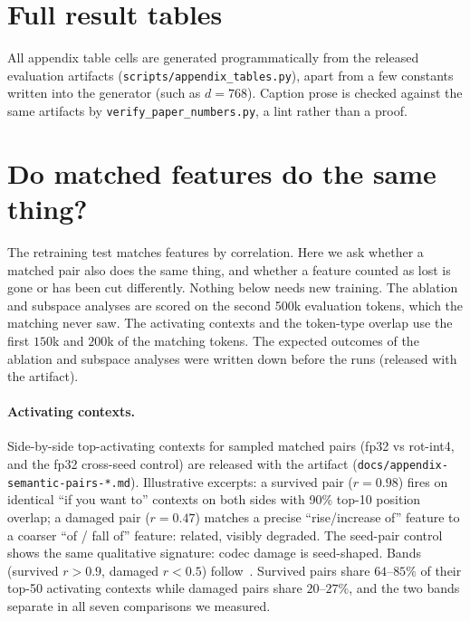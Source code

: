 \documentclass{article}
\begin{document}
\clearpage
\appendix
\section{Full result tables}
\label{app:tables}
All appendix table cells are generated programmatically from the
released evaluation artifacts (\texttt{scripts/appendix\_tables.py}),
apart from a few constants written into the generator (such as $d = 768$). Caption prose is checked against the same
artifacts by \texttt{verify\_paper\_numbers.py}, a lint rather than a
proof.

\clearpage

\section{Do matched features do the same thing?}
\label{app:contexts}
The retraining test matches features by correlation. Here we ask
whether a matched pair also does the same thing, and whether a feature
counted as lost is gone or has been cut differently. Nothing below
needs new training. The ablation and subspace analyses are scored on
the second 500k evaluation tokens, which the matching never saw. The
activating contexts and the token-type overlap use the first $150$k
and $200$k of the matching tokens. The expected outcomes of the
ablation and subspace analyses were written down before the runs
(released with the artifact).

\paragraph{Activating contexts.} Side-by-side top-activating contexts for sampled matched pairs
(fp32 vs rot-int4, and the fp32 cross-seed control) are released with the
artifact (\texttt{docs/appendix-semantic-pairs-*.md}). Illustrative
excerpts: a survived pair ($r=0.98$) fires on identical
``if you want to'' contexts on both sides with 90\% top-10
position overlap; a damaged pair ($r=0.47$) matches a precise
``rise/increase of'' feature to a coarser ``of / fall of''
feature: related, visibly degraded. The seed-pair control shows the
same qualitative signature: codec damage is seed-shaped. Bands
(survived $r>0.9$, damaged $r<0.5$) follow~\citep{duan}. Survived
pairs share $64$--$85\%$ of their top-50 activating contexts while
damaged pairs share $20$--$27\%$, and the two bands separate in all
seven comparisons we measured.
\end{document}

